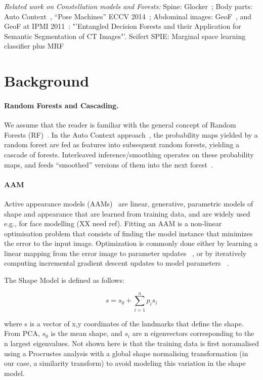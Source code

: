 \documentclass[10pt,twocolumn,letterpaper]{article}
\begin{document}
\emph{Related work on Constellation models and Forests: }
%
Spine: Glocker~\cite{Glocker2013}; 
%
Body parts: Auto Context~\cite{AutoContext2008}, "`Pose Machines"' ECCV 2014~\cite{PoseMachinesECCV2014}; 
% 
Abdominal images: GeoF~\cite{GeoForests2013}, and GeoF at IPMI 2011~\cite{CriminisiAbdominalIPMI2011}: "'Entangled Decision Forests and their Application for Semantic Segmentation of CT Images"'. Seifert SPIE: Marginal space learning classifier plus MRF~\cite{SeifertAnatomicalSPIE2009} 

\section{Background}

\paragraph{Random Forests and Cascading. }
We assume that the reader is familiar with the general concept of Random Forests (RF)~\cite{BreimanRF}. 
%
In the Auto Context approach~\cite{AutoContext2008}, the probability maps yielded by a random forest are fed as features into subsequent random forests, yielding a cascade of forests.  
%
Interleaved inference/smoothing operates on these probability maps, and feeds ``smoothed'' versions of them into the next forest~\cite{DTF,RTF,UweCVPR2013,GeoForests2013}. 
%



\paragraph{AAM}
Active appearance models (AAMs)~\cite{CootesAAM2001} are linear, generative, parametric models of shape and appearance that are learned from training data, and are widely used e.g., for face modelling (XX need ref).  Fitting an AAM is a non-linear optimisation problem that consists of finding the model instance that minimizes the error to the input image.  Optimization is commonly done either by learning a linear mapping from the error image to parameter updates ~\cite{CootesAAM2001}, or by iteratively computing incremental gradient descent updates to model parameters ~\cite{BakerAAM2004}. 

The Shape Model is defined as follows:

\[s = s_0 + \sum_{i=1}^n p_i s_i\]

where s is a vector of x,y coordinates of the landmarks that define the shape.  From PCA, $s_0$ is the mean shape, and $s_i$ are n eigenvectors corresponding to the n largest eigenvalues.  Not shown here is that the training data is first noramalised using a Procrustes analysis with a global shape normalising transformation (in our case, a similarity transform) to avoid modeling this variation in the shape model.
\end{document}
